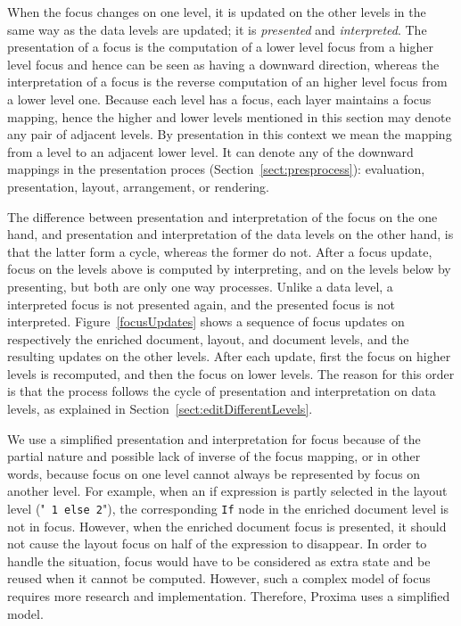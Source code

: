 When the focus changes on one level, it is updated on the other levels in the same way as the data levels are updated; it is {\em presented} and {\em interpreted}. The presentation of a focus is the computation of a lower level focus from a higher level focus and hence can be seen as having a downward direction, whereas the interpretation of a focus is the reverse computation of an higher level focus from a lower level one. Because each level has a focus, each layer maintains a focus mapping, hence the higher and lower levels mentioned in this section may denote any pair of adjacent levels. By presentation in this context we mean the mapping from a level to an adjacent lower level. It can denote any of the downward mappings in the presentation proces (Section~\ref{sect:presprocess}): evaluation, presentation, layout, arrangement, or rendering.

The difference between presentation and interpretation of the focus on the one hand, and presentation and interpretation of the data levels on the other hand, is that the latter form a cycle, whereas the former do not. After a focus update, focus on the levels above is computed by interpreting, and on the levels below by presenting, but both are only one way processes. Unlike a data level, a interpreted focus is not presented again, and the presented focus is not interpreted. Figure~\ref{focusUpdates} shows a sequence of focus updates on respectively the enriched document, layout, and document levels, and the resulting updates on the other levels. After each update, first the focus on higher levels is recomputed, and then the focus on lower levels. The reason for this order is that the process follows the cycle of presentation and interpretation on data levels, as explained in Section~\ref{sect:editDifferentLevels}.


We use a simplified presentation and interpretation for focus because of  the partial nature and possible lack of inverse of the focus mapping, or in other words, because focus on one level cannot always be represented by focus on another level. For example, when an if expression is partly selected in the layout level ("{\tt {}\verb| 1 else 2|}"), the corresponding \verb|If| node in the enriched document level is not in focus. However, when the enriched document focus is presented, it should not cause the layout focus on half of the expression to disappear. In order to handle the situation, focus would have to be considered as extra state and be reused when it cannot be computed. However, such a complex model of focus requires more research and implementation. Therefore, Proxima uses a simplified model.  


